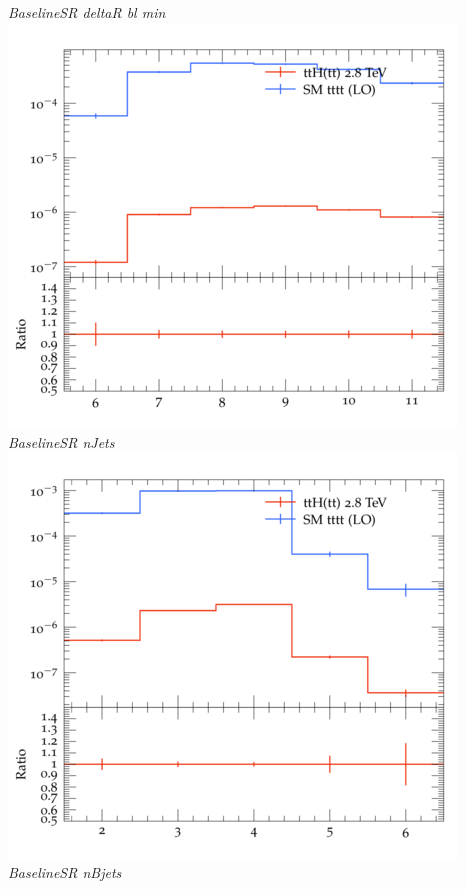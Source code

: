 \documentclass{beamer}
\begin{document}
\begin{frame}
\begin{columns}
\textit{\small BaselineSR deltaR bl min}
\includegraphics[width=\textwidth]{../plots/ttH_2800/tttt_ttH_1LOS/BaselineSR_nJets.png}\\
\textit{\small BaselineSR nJets}
\includegraphics[width=\textwidth]{../plots/ttH_2800/tttt_ttH_1LOS/BaselineSR_nBjets.png}\\
\textit{\small BaselineSR nBjets}
\end{columns}
\end{frame}
\end{document}
